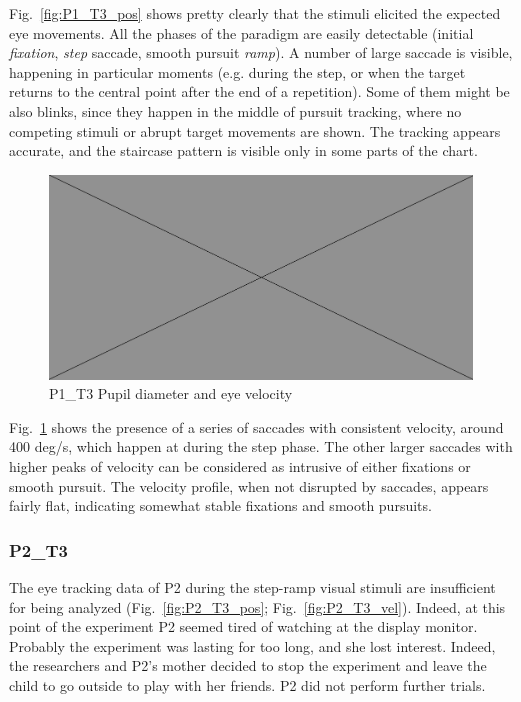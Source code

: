 Fig.~\ref{fig:P1_T3_pos} shows pretty clearly that the stimuli elicited the expected eye movements. All the phases of the paradigm are easily detectable (initial \textit{fixation}, \textit{step} saccade, smooth pursuit \textit{ramp}). A number of large saccade is visible, happening in particular moments (e.g. during the step, or when the target returns to the central point after the end of a repetition). Some of them might be also blinks, since they happen in the middle of pursuit tracking, where no competing stimuli or abrupt target movements are shown. The tracking appears accurate, and the staircase pattern is visible only in some parts of the chart.

\begin{figure}[h]
  \centering
  \includegraphics[width=.5\textwidth]{figures/placeholderImg.jpg}
  \caption[P1\_T3 pupil velocity]{P1\_T3 Pupil diameter and eye velocity}
  \label{fig:P1_T3_vel}
\end{figure}

Fig.~\ref{fig:P1_T3_vel} shows the presence of a series of saccades with consistent velocity, around 400 deg/s, which happen at during the step phase. The other larger saccades with higher peaks of velocity can be considered as intrusive of either fixations or smooth pursuit. The velocity profile, when not disrupted by saccades, appears fairly flat, indicating somewhat stable fixations and smooth pursuits. 



\subsubsection{P2\_T3}
\label{sec:P2_T3}

The eye tracking data of P2 during the step-ramp visual stimuli are insufficient for being analyzed (Fig.~\ref{fig:P2_T3_pos}; Fig.~\ref{fig:P2_T3_vel}). Indeed, at this point of the experiment P2 seemed tired of watching at the display monitor. Probably the experiment was lasting for too long, and she lost interest. Indeed, the researchers and P2’s mother decided to stop the experiment and leave the child to go outside to play with her friends. P2 did not perform further trials.

